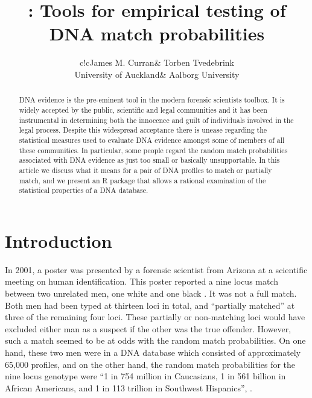 \documentclass[a4paper,11pt]{article}
\author{\begin{tabular}{c!{\hspace{10mm}}c}James M. Curran& Torben Tvedebrink \\University of
  Auckland& Aalborg University\end{tabular}}
\title{\pkg{DNAtools} : Tools for empirical testing of DNA match probabilities}
\newcommand{\proglang}[1]{\textsf{#1}}
\begin{document}



\maketitle

\begin{abstract}
  DNA evidence is the pre-eminent tool in the modern forensic scientists
toolbox. It is widely accepted by the public, scientific and legal
communities and it has been instrumental in determining both the innocence
and guilt of individuals involved in the legal process. Despite this
widespread acceptance there
is unease regarding the statistical measures used to evaluate DNA
evidence amongst some of members of all these communities. In particular,
some people regard the random match probabilities associated with
DNA evidence as just too small or basically unsupportable. In this
article we discuss what it means for a pair of DNA profiles to match
or partially match, and we  present an \proglang{R} package that allows a rational
examination of the statistical properties of a DNA database.
\end{abstract}

\section[Introduction]{Introduction}
\label{sec:introduction}
In 2001, a poster was presented by a forensic scientist from Arizona
\citep{troyer2001} at a scientific meeting on human
identification. This poster reported a nine locus match between two
unrelated men, one white and one black \citep{kaye2009}.  It was not a
full match. Both men had been typed at thirteen loci in total, and
``partially matched'' at three of the remaining four loci. These
partially or non-matching loci would have excluded either man as a
suspect if the other was the true offender. However, such a match
seemed to be at odds with the random match probabilities. On one hand,
these two men were in a DNA database which consisted of approximately
65,000 profiles, and on the other hand, the random match probabilities
for the nine locus genotype were ``1 in 754 million in Caucasians, 1
in 561 billion in African Americans, and 1 in 113 trillion in
Southwest Hispanics'', \citet{troyer2001}.
\end{document}
